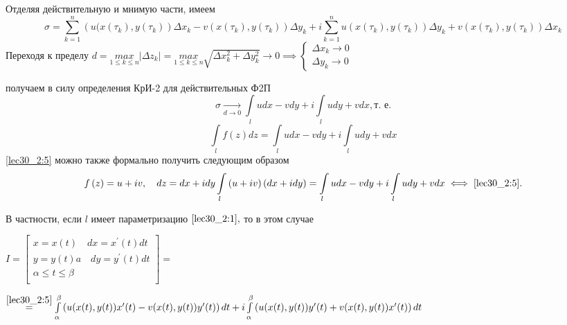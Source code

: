 \documentclass[../../main.tex]{subfiles}
\begin{document}
Отделяя действительную и мнимую части, имеем
\[
\sigma =    \sum_{k=1}^n{\left(u(x(\tau_k), y(\tau_k)\right)\Delta x_k -
v\left(x(\tau_k), y(\tau_k)\right)\Delta y_k} + 
i\sum_{k=1}^n{u\left(x(\tau_k), y(\tau_k)\right)\Delta y_k + 
v\left(x(\tau_k), y(\tau_k)\right)\Delta x_k}
\]
Переходя к пределу 
$d = \underset{1 \leq k \leq n}{max}|\Delta z_k| = 
\underset{1 \leq k \leq n}{max}\sqrt{\Delta x_k^2 + \Delta y_k^2}
\longrightarrow 0 \implies
\begin{cases}
    \Delta x_k \longrightarrow 0\\
    \Delta y_k \longrightarrow 0
\end{cases}$

получаем в силу определения КрИ-2 для действительных Ф2П
\[
\sigma \underset{d \to 0}{\longrightarrow} \int\limits_l{
udx - vdy} + i\int\limits_l{udy + vdx}, \text{т.~е.}
\]
\begin{equation}
    \label{lec30_2:5}    
    \int\limits_{l}{f\left(z\right)dz} = \int\limits_l{udx - vdy} + 
    i\int\limits_l{udy + vdx}
\end{equation}
\eqref{lec30_2:5} можно также формально получить следующим образом 
\[
f\left(z\right) = u + iv, \quad
dz = dx + idy
\int\limits_l{\left(u+iv\right)\left(dx + idy\right)} = 
\int\limits_l{udx - vdy} + i\int\limits_l{udy + vdx} 
\iff \eqref{lec30_2:5}.
\]

В частности, если $l$ имеет параметризацию $\eqref{lec30_2:1},$ то в 
этом случае 

$I = \left[
\begin{array}{ccc}
     x = x\left(t\right)\quad dx = x^\prime\left(t\right)dt \\
     y = y\left(t\right)a\quad dy = y^\prime\left(t\right)dt \\
     \alpha \leq t \leq \beta\\
\end{array} 
\right]=
$

$
\stackrel{\eqref{lec30_2:5}}{=}
\int\limits_\alpha^\beta{\left(u(x(t), y(t))x^\prime(t) - 
v(x(t), y(t))y^\prime(t)\right)dt} + i\int\limits_\alpha^\beta{
\left(u(x(t), y(t))y^\prime(t) + v(x(t), y(t))x^\prime(t)\right)dt}
$
\end{document}
